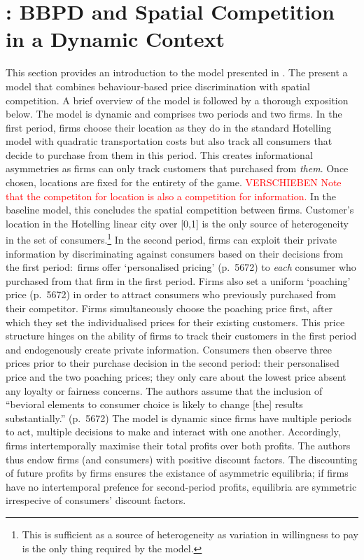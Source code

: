 \documentclass[a4paper, 11 pt, fleqn]{article}
\begin{document}
\section{\citet{Choe.2018}: BBPD and Spatial Competition in a Dynamic Context} \label{sec:choe-2018-intro}
%
This section provides an introduction to the model presented in \citet{Choe.2018}. The present a model that combines
behaviour-based price discrimination with spatial competition. A brief overview of the model is followed by a thorough
exposition below. The model is dynamic and comprises two periods and two firms.
In the first period, firms choose their location as they do in the standard Hotelling model with quadratic transportation costs
but also track all consumers that decide to purchase from them in this period. This creates informational asymmetries as
firms can only track customers that purchased from \textit{them}. Once chosen, locations are fixed for the entirety of the
game. \textcolor{red}{VERSCHIEBEN Note that the competiton for location is also a competition for information.} In the baseline model, this concludes the spatial competition between firms. Customer's location in the Hotelling linear
city over [0,1] is the only source of heterogeneity in the set of consumers.\footnote{This is sufficient as a source of heterogeneity as variation in willingness to pay is the only thing required by the model.} In the second period, firms can exploit
their private information by discriminating against consumers based on their decisions from the first period:~firms offer
`personalised pricing' (p.~5672) to \textit{each} consumer who purchased from that firm in the first period. Firms also set
a uniform `poaching' price (p.~5672) in order to attract consumers who previously purchased from their competitor.
Firms simultaneously choose the poaching price first, after which they set the individualised prices for their existing customers.
This price structure hinges on the ability of firms to track their customers in the first period and endogenously create private
information. Consumers then observe three prices prior to their purchase decision in the second period: their personalised price
and the two poaching prices; they only care about the lowest price absent any loyalty or fairness concerns. The authors assume that
the inclusion of ``bevioral elements to consumer choice is likely to change [the] results substantially.'' (p.~5672)
The model is dynamic since firms have multiple periods to act, multiple decisions to make and interact with one another.
Accordingly, firms intertemporally maximise their total profits over both profits. The authors thus endow firms (and consumers) with
positive discount factors. The discounting of future profits by firms ensures the existance of asymmetric equilibria; if firms have no
intertemporal prefence for second-period profits, equilibria are symmetric irrespecive of consumers' discount factors.
\end{document}
